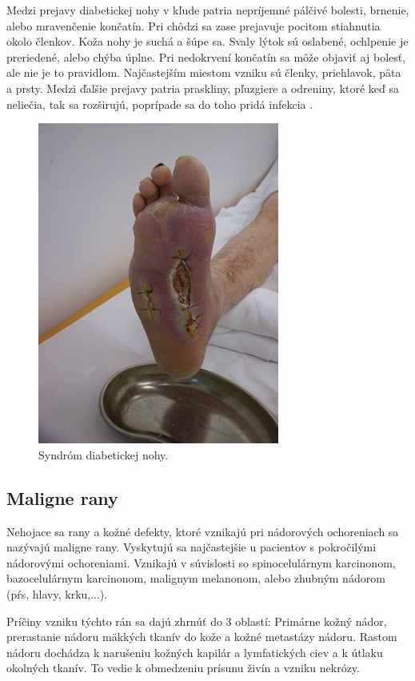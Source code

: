 Medzi prejavy diabetickej nohy v kľude patria nepríjemné pálčivé bolesti, brnenie, alebo mravenčenie končatín. Pri chôdzi sa zase prejavuje pocitom stiahnutia okolo členkov. Koža nohy je suchá a šúpe sa. Svaly lýtok sú oslabené, ochlpenie je preriedené, alebo chýba úplne. Pri nedokrvení končatín sa môže objaviť aj bolesť, ale nie je to pravidlom. Najčastejším miestom vzniku sú členky, priehlavok, päta a prsty. Medzi ďalšie prejavy patria praskliny, pľuzgiere a odreniny, ktoré keď sa neliečia, tak sa rozširujú, poprípade sa do toho pridá infekcia \cite{pcCdSrbbhhlr5YcQ, Pokorna2012}.
\begin{figure}[h]
  \centering
  \includegraphics[scale=2]{fig/diabeticka-noha.jpg}
  \caption{Syndróm diabetickej nohy. \cite{uGOum7N9LzIGa5X2}}
  \label{fig:diabeticka-noha}
\end{figure}

\subsection{Maligne rany}
Nehojace sa rany a kožné defekty, ktoré vznikajú pri nádorových ochoreniach sa nazývajú maligne rany. Vyskytujú sa najčastejšie u pacientov s pokročilými nádorovými ochoreniami. Vznikajú v súvislosti so spinocelulárnym karcinonom, bazocelulárnym karcinonom, malignym melanonom, alebo zhubným nádorom (pŕs, hlavy, krku,...).

Príčiny vzniku týchto rán sa dajú zhrnúť do 3 oblastí: Primárne kožný nádor, prerastanie nádoru mäkkých tkanív do kože a kožné metastázy nádoru. Rastom nádoru dochádza k narušeniu kožných kapilár a lymfatických ciev a k útlaku okolných tkanív. To vedie k obmedzeniu prísunu živín a vzniku nekrózy.

